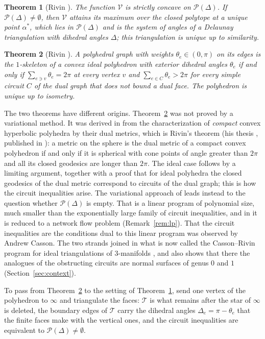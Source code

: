 \documentclass[11pt]{amsart}
\newtheorem{theorem}{Theorem}[section]
\theoremstyle{definition}
\theoremstyle{remark}
\newcommand{\cT}{\mathcal{T}}
\begin{document}
\begin{theorem}[Rivin \cite{Riv94}]\label{thm:rivin}
The function $\mathcal V$ is strictly concave on $\mathcal P(\Delta)$. If $\mathcal P(\Delta)\neq\emptyset$, then $\mathcal V$ attains its maximum over the closed polytope at a unique point $\alpha^*$, which lies in $\mathcal P(\Delta)$ and is the system of angles of a
Delaunay triangulation with dihedral angles $\Delta$; this triangulation is unique up to similarity.
\end{theorem}

\begin{theorem}[Rivin \cite{Riv96}]\label{thm:ideal}
A polyhedral graph with weights $\theta_e\in(0,\pi)$ on its edges is the $1$-skeleton of a convex ideal polyhedron with exterior dihedral angles $\theta_e$
if and only if $\sum_{e\ni v}\theta_e=2\pi$ at every vertex $v$ and $\sum_{e\in C}\theta_e>2\pi$ for every simple circuit $C$ of the dual graph that does not bound a dual face. The polyhedron is unique up to isometry.
\end{theorem}

The two theorems have different origins. Theorem~\ref{thm:ideal} was not proved by a variational method. It was derived in \cite{Riv96} from the characterization of \emph{compact} convex hyperbolic polyhedra by their dual metrics, which is Rivin's theorem (his thesis \cite{RivTh}, published in \cite{HR93}):
a metric on the sphere is the dual metric of a compact convex polyhedron if and only if it is spherical with cone points of angle greater than $2\pi$ and all its closed geodesics are longer than $2\pi$. The ideal case follows by a limiting argument,
together with a proof that for ideal polyhedra the closed geodesics of the dual metric correspond to circuits of the dual graph; this is how the circuit inequalities arise.
The variational approach of \cite{Riv94} leads instead to the question whether $\mathcal P(\Delta)$ is empty. That is a linear program of polynomial size, much smaller than the exponentially large family of circuit inequalities, and in \cite{Riv03} it is reduced to a network flow problem (Remark~\ref{rem:lp}).
That the circuit inequalities are the conditions dual to this linear program was observed by Andrew Casson. The two strands joined in what is now called the Casson--Rivin program for ideal triangulations of $3$-manifolds \cite{FG11}, and \cite{Riv03} also shows that there the analogues of the obstructing circuits are normal surfaces of genus $0$ and $1$ (Section~\ref{sec:context}).

To pass from Theorem~\ref{thm:ideal} to the setting of Theorem~\ref{thm:rivin}, send one vertex of the polyhedron to $\infty$ and triangulate the faces: $\cT$ is what remains after the star of $\infty$ is deleted, the boundary edges of $\cT$ carry the dihedral angles $\Delta_e=\pi-\theta_e$
that the finite faces make with the vertical ones, and the circuit inequalities are equivalent to $\mathcal P(\Delta)\ne\emptyset$.
\end{document}
